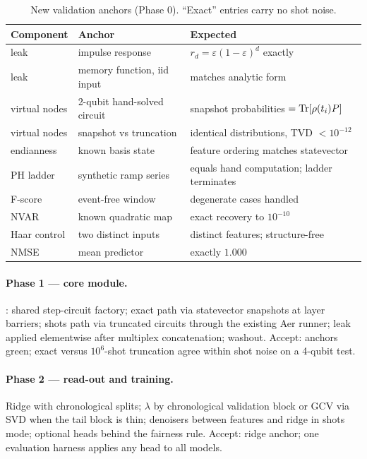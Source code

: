 \begin{table}[t]
\centering\small
\caption{New validation anchors (Phase 0). ``Exact'' entries carry no shot
noise.}
\label{tab:rfqrc-anchors}
\begin{tabular}{@{}llp{5.2cm}@{}}
\toprule
Component & Anchor & Expected \\
\midrule
leak & impulse response & $r_d=\varepsilon(1-\varepsilon)^d$ exactly \\
leak & memory function, iid input & matches analytic form \\
virtual nodes & 2-qubit hand-solved circuit & snapshot probabilities $=\operatorname{Tr}[\rho(t_i)P]$ \\
virtual nodes & snapshot vs truncation & identical distributions, TVD $<10^{-12}$ \\
endianness & known basis state & feature ordering matches statevector \\
PH ladder & synthetic ramp series & equals hand computation; ladder terminates \\
F-score & event-free window & degenerate cases handled \\
NVAR & known quadratic map & exact recovery to $10^{-10}$ \\
Haar control & two distinct inputs & distinct features; structure-free \\
NMSE & mean predictor & exactly $1.000$ \\
\bottomrule
\end{tabular}
\end{table}

\paragraph{Phase 1 --- core module.} : shared
step-circuit factory; exact path via statevector snapshots at layer
barriers; shots path via truncated circuits through the existing Aer runner;
leak applied elementwise after multiplex concatenation; washout. Accept:
anchors green; exact versus $10^6$-shot truncation agree within shot noise
on a 4-qubit test.

\paragraph{Phase 2 --- read-out and training.} Ridge with chronological
splits; $\lambda$ by chronological validation block or GCV via SVD when the
tail block is thin; denoisers between features and ridge in shots mode;
optional heads behind the fairness rule. Accept: ridge anchor; one
evaluation harness applies any head to all models.

